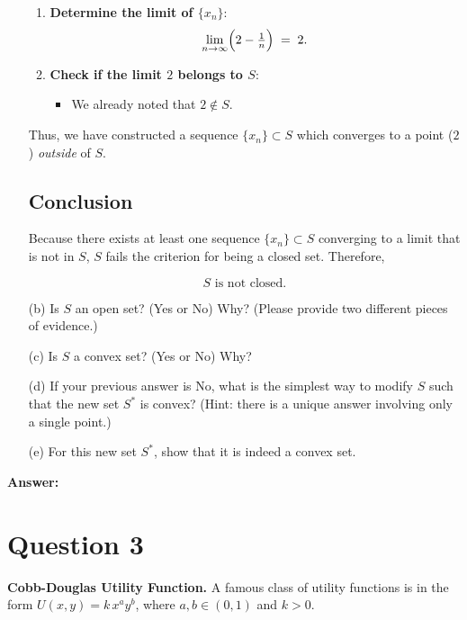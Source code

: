 \documentclass[12pt]{article}
\begin{document}
\begin{enumerate}
\begin{enumerate}
        \item \textbf{Determine the limit of \( \{x_n\} \)}:  
        \[
        \lim_{n \to \infty} \Bigl(2 - \tfrac{1}{n}\Bigr) \;=\; 2.
        \]
        
        \item \textbf{Check if the limit \( 2 \) belongs to \( S \)}:  
        \begin{itemize}
            \item We already noted that \( 2 \notin S \).
        \end{itemize}
    \end{enumerate}
    
    Thus, we have constructed a sequence \( \{x_n\} \subset S \) which converges to a point (\( 2 \)) \textit{outside} of \( S \).
    
    \hrulefill
    
    \subsection*{Conclusion}
    
    Because there exists at least one sequence \( \{x_n\} \subset S \) converging to a limit that is not in \( S \), \( S \) fails the criterion for being a closed set. Therefore,
    
    \[
    \boxed{ S \text{ is not closed.} }
    \]

    \newpage
    
    \item[(b)] Is \(S\) an open set? (Yes or No) Why? (Please provide two different pieces of evidence.)
    \item[(c)] Is \(S\) a convex set? (Yes or No) Why?
    \item[(d)] If your previous answer is No, what is the simplest way to modify \(S\) such that the new set \(S^*\) is convex? (Hint: there is a unique answer involving only a single point.)
    \item[(e)] For this new set \(S^*\), show that it is indeed a convex set.
\end{enumerate}

\noindent \textbf{Answer:}
\vspace{3cm}

\newpage

\section*{Question 3}
\textbf{Cobb-Douglas Utility Function.} A famous class of utility functions is in the form \(U(x, y) = k \, x^a y^b\), where \(a, b \in (0, 1)\) and \(k > 0\).
\end{document}
